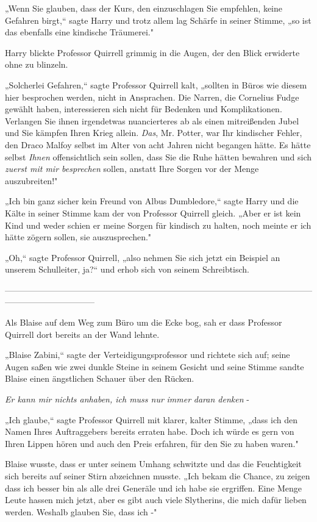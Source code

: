 {„Wenn Sie glauben, dass der Kurs, den einzuschlagen Sie empfehlen, keine Gefahren birgt,“ sagte Harry und trotz allem lag Schärfe in seiner Stimme, „so ist das ebenfalls eine kindische Träumerei."

Harry blickte Professor Quirrell grimmig in die Augen, der den Blick erwiderte ohne zu blinzeln.

„Solcherlei Gefahren,“ sagte Professor Quirrell kalt, „sollten in Büros wie diesem hier besprochen werden, nicht in Ansprachen. Die Narren, die Cornelius Fudge gewählt haben, interessieren sich nicht für Bedenken und Komplikationen. Verlangen Sie ihnen irgendetwas nuancierteres ab als einen mitreißenden Jubel und Sie kämpfen Ihren Krieg allein. \emph{Das}, Mr. Potter, war Ihr kindischer Fehler, den Draco Malfoy selbst im Alter von acht Jahren nicht begangen hätte. Es hätte selbst \emph{Ihnen} offensichtlich sein sollen, dass Sie die Ruhe hätten bewahren und sich \emph{zuerst mit mir besprechen} sollen, anstatt Ihre Sorgen vor der Menge auszubreiten!"

„Ich bin ganz sicher kein Freund von Albus Dumbledore,“ sagte Harry und die Kälte in seiner Stimme kam der von Professor Quirrell gleich. „Aber er ist kein Kind und weder schien er meine Sorgen für kindisch zu halten, noch meinte er ich hätte zögern sollen, sie auszusprechen."

„Oh,“ sagte Professor Quirrell, „also nehmen Sie sich jetzt ein Beispiel an unserem Schulleiter, ja?“ und erhob sich von seinem Schreibtisch.

--------------------------------------------------------------------------------------------------------------------------------------------

\hfill\break Als Blaise auf dem Weg zum Büro um die Ecke bog, sah er dass Professor Quirrell dort bereits an der Wand lehnte.

„Blaise Zabini,“ sagte der Verteidigungsprofessor und richtete sich auf; seine Augen saßen wie zwei dunkle Steine in seinem Gesicht und seine Stimme sandte Blaise einen ängstlichen Schauer über den Rücken.

\emph{Er kann mir nichts anhaben, ich muss nur} \emph{immer} \emph{daran denken} -

„Ich glaube,“ sagte Professor Quirrell mit klarer, kalter Stimme, „dass ich den Namen Ihres Auftraggebers bereits erraten habe. Doch ich würde es gern von Ihren Lippen hören und auch den Preis erfahren, für den Sie zu haben waren."

Blaise wusste, dass er unter seinem Umhang schwitzte und das die Feuchtigkeit sich bereits auf seiner Stirn abzeichnen musste. „Ich bekam die Chance, zu zeigen dass ich besser bin als alle drei Generäle und ich habe sie ergriffen. Eine Menge Leute hassen mich jetzt, aber es gibt auch viele Slytherins, die mich dafür lieben werden. Weshalb glauben Sie, dass ich -"

}
